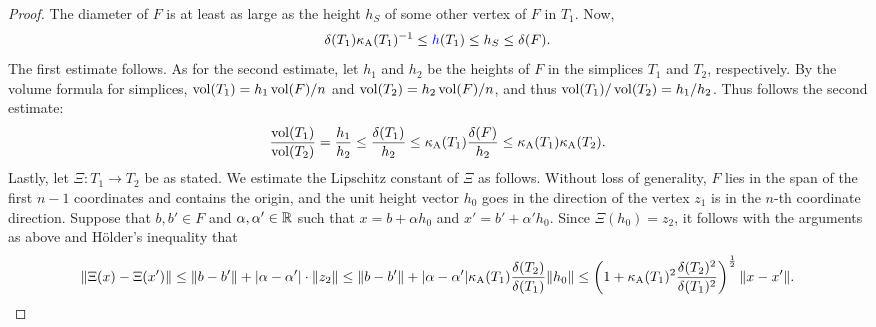 \documentclass[10pt,a4paper]{article}
\begin{document}
\begin{proof}
    The diameter of $F$ is at least as large as the height $h_S$ of some other vertex of $F$ in $T_{1}$. 
    Now, 
    \begin{align*}
        \diam(T_{1}) \aspectratio(T_{1})^{-1} \leq \height(T_{1}) \leq h_S \leq \diam(F).
    \end{align*}
    The first estimate follows. 
    As for the second estimate,
    let $h_1$ and $h_2$ be the heights of $F$ in the simplices $T_1$ and $T_2$, respectively. 
    By the volume formula for simplices, $\operatorname{vol}(T_1) = h_1 \operatorname{vol}(F)/n$ and $\operatorname{vol}(T_2) = h_2 \operatorname{vol}(F)/n$, and thus $\operatorname{vol}(T_1)/\operatorname{vol}(T_2) = h_1/h_2$. Thus follows the second estimate: 
    \begin{align*}
        \frac{ \operatorname{vol}(T_1) }{ \operatorname{vol}(T_2) }
        = 
        \frac{ h_1 }{ h_2 }
        \leq
        \frac{ {\delta}(T_1) }{ h_2 }
        \leq
        \kappa_{\rm A}(T_{1}) \frac{ {\delta}(F) }{ h_2 }
        \leq
        \kappa_{\rm A}(T_{1}) \kappa_{\rm A}(T_{2})
        .
    \end{align*}
    Lastly, let $\Xi : T_1 \rightarrow T_2$ be as stated. 
    We estimate the Lipschitz constant of $\Xi$ as follows. 
    Without loss of generality, $F$ lies in the span of the first $n-1$ coordinates and contains the origin, 
    and the unit height vector $h_0$ goes in the direction of the vertex $z_1$ is in the $n$-th coordinate direction.
    Suppose that $b, b' \in F$ and $\alpha, \alpha' \in {\mathbb R}$ such that $x = b + \alpha h_0$ and $x' = b' + \alpha' h_0$.
    Since $\Xi(h_0) = z_2$, it follows with the arguments as above and H\"older's inequality that 
    \begin{align*}
        \| \Xi(x) - \Xi(x') \|
        \leq  
        \| b - b' \| + | \alpha - \alpha' | \cdot \| z_2 \|
        \leq  
        \| b - b' \| + | \alpha - \alpha' | \kappa_{\rm A}(T_1) \frac{{\delta}(T_2)}{{\delta}(T_1)} \| h_0 \|
        \leq 
        \left( 1 + \kappa_{\rm A}(T_1)^2 \frac{{\delta}(T_2)^2}{{\delta}(T_1)^2} \right)^{\frac 1 2} \| x-x' \|
        .
    \end{align*}

\end{proof}
\end{document}
